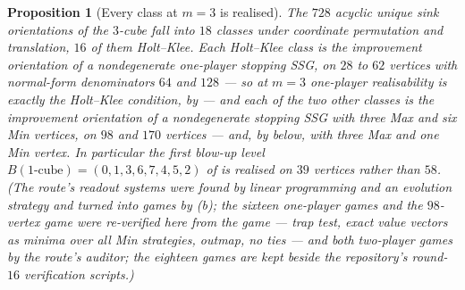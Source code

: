 \documentclass[11pt]{article}
\theoremstyle{plain}
\newtheorem{proposition}[theorem]{Proposition}
\theoremstyle{definition}
\begin{document}
\begin{proposition}[Every class at $m=3$ is realised]\label{prop:m3-realised}
The $728$ acyclic unique sink orientations of the $3$-cube fall into $18$
classes under coordinate permutation and translation, $16$ of them
Holt--Klee. Each Holt--Klee class is the improvement orientation of a
nondegenerate one-player stopping SSG, on $28$ to $62$ vertices with
normal-form denominators $64$ and $128$ --- so at $m=3$ one-player realisability is
exactly the Holt--Klee condition, by  --- and each
of the two other classes is the improvement orientation of a nondegenerate
stopping SSG with three Max and six Min vertices, on $98$ and $170$
vertices --- and, by  below, with three Max and one
Min vertex. In particular the first blow-up level
$B(\text{$1$-cube})=(0,1,3,6,7,4,5,2)$ of  is
realised on $39$ vertices rather than $58$. (The route's readout systems
were found by linear programming and an evolution strategy and turned
into games by (b); the sixteen one-player games
and the $98$-vertex game were re-verified here from the game --- trap
test, exact value vectors as minima over all Min strategies, outmap, no
ties --- and both two-player games by the route's auditor; the eighteen
games are kept beside the repository's round-$16$ verification scripts.)
\end{proposition}
\end{document}
